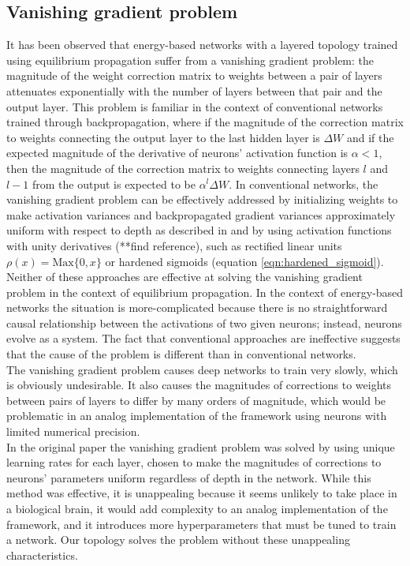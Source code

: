 \documentclass[format=sigconf]{acmart}
\newcommand{\npar}{\\\indent}
\begin{document}
\subsection{Vanishing gradient problem}
\label{sec:vangrad}

It has been observed \cite{scellier17} that energy-based networks with a layered topology trained using equilibrium propagation suffer from a vanishing gradient problem: the magnitude of the weight correction matrix to weights between a pair of layers attenuates exponentially with the number of layers between that pair and the output layer. This problem is familiar in the context of conventional networks trained through backpropagation, where if the magnitude of the correction matrix to weights connecting the output layer to the last hidden layer is $\Delta W$ and if the expected magnitude of the derivative of neurons' activation function is $\alpha<1$, then the magnitude of the correction matrix to weights connecting layers $l$ and $l-1$ from the output is expected to be $\alpha^l\Delta W$. In conventional networks, the vanishing gradient problem can be effectively addressed by initializing weights to make activation variances and backpropagated gradient variances approximately uniform with respect to depth as described in \cite{glorot2010} and by using activation functions with unity derivatives (**find reference), such as rectified linear units $\rho(x)=\text{Max}\{0, x\}$ or hardened sigmoids (equation \ref{eqn:hardened_sigmoid}).
\npar
Neither of these approaches are effective at solving the vanishing gradient problem in the context of equilibrium propagation. In the context of energy-based networks the situation is more-complicated because there is no straightforward causal relationship between the activations of two given neurons; instead, neurons evolve as a system. The fact that conventional approaches are ineffective suggests that the cause of the problem is different than in conventional networks.
\npar
The vanishing gradient problem causes deep networks to train very slowly, which is obviously undesirable. It also causes the magnitudes of corrections to weights between pairs of layers to differ by many orders of magnitude, which would be problematic in an analog implementation of the framework using neurons with limited numerical precision.
\npar
In the original paper the vanishing gradient problem was solved by using unique learning rates for each layer, chosen to make the magnitudes of corrections to neurons' parameters uniform regardless of depth in the network. While this method was effective, it is unappealing because it seems unlikely to take place in a biological brain, it would add complexity to an analog implementation of the framework, and it introduces more hyperparameters that must be tuned to train a network. Our topology solves the problem without these unappealing characteristics.
\end{document}
